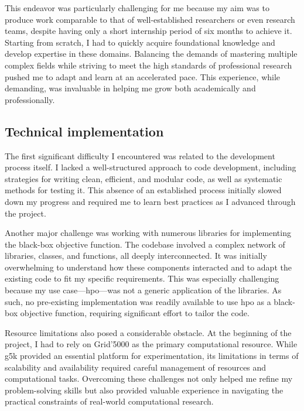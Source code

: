 This endeavor was particularly challenging for me because my aim was to produce work comparable to that of well-established researchers or even research teams, despite having only a short internship period of six months to achieve it. Starting from scratch, I had to quickly acquire foundational knowledge and develop expertise in these domains. Balancing the demands of mastering multiple complex fields while striving to meet the high standards of professional research pushed me to adapt and learn at an accelerated pace. This experience, while demanding, was invaluable in helping me grow both academically and professionally.


\subsection{Technical implementation}
\label{sec:tech_impl}


The first significant difficulty I encountered was related to the development process itself. I lacked a well-structured approach to code development, including strategies for writing clean, efficient, and modular code, as well as systematic methods for testing it. This absence of an established process initially slowed down my progress and required me to learn best practices as I advanced through the project.

Another major challenge was working with numerous libraries for implementing the black-box objective function. The codebase involved a complex network of libraries, classes, and functions, all deeply interconnected. It was initially overwhelming to understand how these components interacted and to adapt the existing code to fit my specific requirements. This was especially challenging because my use case—\acrlong{hpo}—was not a generic application of the libraries. As such, no pre-existing implementation was readily available to use \acrshort{hpo} as a black-box objective function, requiring significant effort to tailor the code.

Resource limitations also posed a considerable obstacle. At the beginning of the project, I had to rely on Grid'5000 as the primary computational resource. While g5k provided an essential platform for experimentation, its limitations in terms of scalability and availability required careful management of resources and computational tasks. Overcoming these challenges not only helped me refine my problem-solving skills but also provided valuable experience in navigating the practical constraints of real-world computational research.
